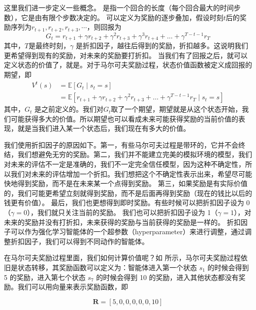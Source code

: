 这里我们进一步定义一些概念。 是指一个回合的长度（每个回合最大的时间步数），它是由有限个步数决定的。
可以定义为奖励的逐步叠加，假设时刻$t$后的奖励序列为$r_{t+1},r_{t+2},r_{t+3},\cdots$，则回报为
\begin{equation}
  G_{t}=r_{t+1}+\gamma r_{t+2}+\gamma^{2} r_{t+3}+\gamma^{3} r_{t+4}+\ldots+\gamma^{T-t-1} r_{T}
  \label{eq:}
\end{equation}
其中，$T$是最终时刻，$\gamma$ 是折扣因子，越往后得到的奖励，折扣越多。这说明我们更希望得到现有的奖励，对未来的奖励要打折扣。
当我们有了回报之后，就可以定义状态的价值了，就是。对于马尔可夫奖励过程，状态价值函数被定义成回报的期望，即
\begin{equation}
  \begin{aligned}
    V^{t}(s) &=\mathbb{E}\left[G_{t} \mid s_{t}=s\right] \\
    &=\mathbb{E}\left[r_{t+1}+\gamma r_{t+2}+\gamma^{2} r_{t+3}+\ldots+\gamma^{T-t-1} r_{T} \mid s_{t}=s\right]
    \end{aligned}
  \label{eq:}
\end{equation}
其中，$G_t$ 是之前定义的。我们对$G_t$取了一个期望，期望就是从这个状态开始，我们可能获得多大的价值。所以期望也可以看成未来可能获得奖励的当前价值的表现，就是当我们进入某一个状态后，我们现在有多大的价值。

我们使用折扣因子的原因如下。第一，有些马尔可夫过程是带环的，它并不会终结，我们想避免无穷的奖励。第二，我们并不能建立完美的模拟环境的模型，我们对未来的评估不一定是准确的，我们不一定完全信任模型，因为这种不确定性，所以我们对未来的评估增加一个折扣。我们想把这个不确定性表示出来，希望尽可能快地得到奖励，而不是在未来某一个点得到奖励。
第三，如果奖励是有实际价值的，我们可能更希望立刻就得到奖励，而不是后面再得到奖励（现在的钱比以后的钱更有价值）。
最后，我们也更想得到即时奖励。有些时候可以把折扣因子设为 0（$\gamma=0$），我们就只关注当前的奖励。
我们也可以把折扣因子设为 1（$\gamma=1$），对未来的奖励并没有打折扣，未来获得的奖励与当前获得的奖励是一样的。
折扣因子可以作为强化学习智能体的一个超参数（hyperparameter）来进行调整，通过调整折扣因子，我们可以得到不同动作的智能体。

在马尔可夫奖励过程里面，我们如何计算价值呢？如 所示，马尔可夫奖励过程依旧是状态转移，其奖励函数可以定义为：智能体进入第一个状态 $s_1$ 的时候会得到 5 的奖励，进入第七个状态 $s_7$ 的时候会得到 10 的奖励，进入其他状态都没有奖励。我们可以用向量来表示奖励函数，即

\begin{equation}
  \label{eq:}
  \boldsymbol{R}=[5,0,0,0,0,0,10]
\end{equation}

